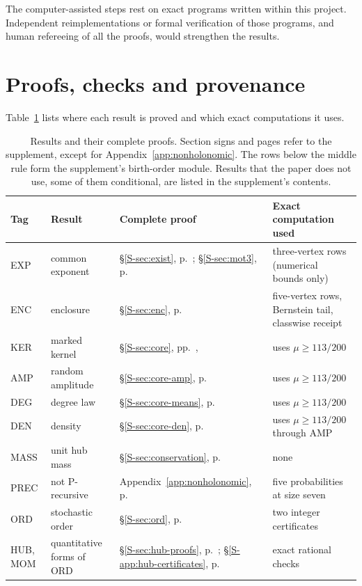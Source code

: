 \documentclass[11pt]{article}
\theoremstyle{remark}
\begin{document}
The computer-assisted steps rest on exact programs written within this project. Independent reimplementations or formal verification of those programs, and human refereeing of all the proofs, would strengthen the results.

\section{Proofs, checks and provenance}\label{sec:provenance}
Table~\ref{tab:map} lists where each result is proved and which exact computations it uses.

\begin{table}[ht]
\centering\small
\begin{tabular}{@{}l>{\raggedright\arraybackslash}p{3.1cm}>{\raggedright\arraybackslash}p{4.3cm}>{\raggedright\arraybackslash}p{4.4cm}@{}}
\toprule
Tag & Result & Complete proof & Exact computation used\\
\midrule
EXP & common exponent & \S\ref{S-sec:exist}, p.~\pageref{S-sec:exist}; \S\ref{S-sec:mot3}, p.~\pageref{S-sec:mot3} & three-vertex rows (numerical bounds only)\\
ENC & enclosure & \S\ref{S-sec:enc}, p.~\pageref{S-sec:enc} & five-vertex rows, Bernstein tail, classwise receipt\\
KER & marked kernel & \S\ref{S-sec:core}, pp.~\pageref{S-sec:core}, \pageref{S-lem:core-renewal} & uses $\mu\ge113/200$\\
AMP & random amplitude & \S\ref{S-sec:core-amp}, p.~\pageref{S-sec:core-amp} & uses $\mu\ge113/200$\\
DEG & degree law & \S\ref{S-sec:core-means}, p.~\pageref{S-sec:core-means} & uses $\mu\ge113/200$\\
DEN & density & \S\ref{S-sec:core-den}, p.~\pageref{S-sec:core-den} & uses $\mu\ge113/200$ through AMP\\
MASS & unit hub mass & \S\ref{S-sec:conservation}, p.~\pageref{S-sec:conservation} & none\\
PREC & not P-recursive & Appendix~\ref{app:nonholonomic}, p.~\pageref{app:nonholonomic} & five probabilities at size seven\\
\midrule
ORD & stochastic order & \S\ref{S-sec:ord}, p.~\pageref{S-sec:ord} & two integer certificates\\
HUB, MOM & quantitative forms of ORD & \S\ref{S-sec:hub-proofs}, p.~\pageref{S-sec:hub-proofs}; \S\ref{S-app:hub-certificates}, p.~\pageref{S-app:hub-certificates} & exact rational checks\\
\bottomrule
\end{tabular}
\caption{Results and their complete proofs. Section signs and pages refer to the supplement, except for Appendix~\ref{app:nonholonomic}. The rows below the middle rule form the supplement's birth-order module. Results that the paper does not use, some of them conditional, are listed in the supplement's contents.}\label{tab:map}
\end{table}
\end{document}
